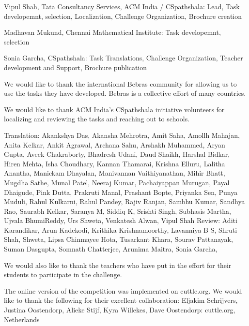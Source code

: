 
Vipul Shah, Tata Consultancy Services, ACM India / CSpathshala: Lead, Task developemnt, selection, Localization, Challenge Organization, 
Brochure creation

Madhavan Mukund, Chennai Mathematical Institute: Task developemnt, selection

Sonia Garcha, CSpathshala: Task Translations, Challenge Organization, Teacher development and Support, Brochure publication


We would like to thank the international Bebras community for allowing us to use the tasks they have developed. Bebras is a collective effort of many countries.

We would like to thank ACM India's CSpathshala initiative volunteers for localizing and reviewing the tasks and reaching out to schools.

Translation:  Akankshya Das, Akansha Mehrotra, Amit Saha, Amollh Mahajan, 
Anita Kelkar, Ankit Agrawal, Archana Sahu, Arshakh Muhammed, Aryan Gupta, Aveek Chakraborty, 
Bhadresh Udani, Daud Shaikh,
Harshal Bidkar, Hiren Mehta, Isha Choudhary, Kannan Thamarai, Krishna Elluru, Lalitha Anantha,
Manickam Dhayalan, Manivannan Vaithiyanathan, Mihir Bhatt, Mugdha Sathe, Munal Patel, Neeraj Kumar, 
Pachaiyappan Murugan, Payal Dhaigude, Pink Dutta, Prakruti Manal, Prashant Bopte, Priyanka Sen, Punya Muduli,
Rahul Kulkarni, Rahul Pandey, Rajiv Ranjan, 
Sambhu Kumar,  Sandhya Rao,  Saurabh Kelkar, Saranya M, Siddiq K,
Srishti Singh, Subhasis Martha, Ujvala BhumiReddy, Urs Shweta, Venkatesh Alwan, 
Vipul Shah
Review: Aditi Karandikar, Arun Kadekodi, 
Krithika Krishnamoorthy, 
Lavanniya B S, 
Shruti Shah, 
Shweta,
Lipsa Chinmayee Hota, Tusarkant Khara, Sourav Pattanayak,
Suman Dasgupta, Somnath Chatterjee, Arunima Maitra,
Sonia Garcha,



We would also like to thank the teachers who have put in the effort for their students 
to participate in the challenge. 

The online version of the competition was implemented on cuttle.org. We would like to thank the following for their excellent collaboration:
Eljakim Schrijvers, Justina Oostendorp, Alieke Stijf, Kyra Willekes, Dave Oostendorp: cuttle.org, Netherlands

\vskip 11pt


